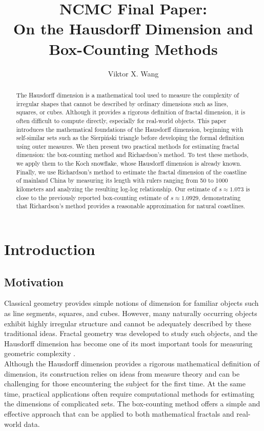 \documentclass{article}
\title{NCMC Final Paper: \\ On the Hausdorff Dimension and Box-Counting Methods}
\author{Viktor X. Wang}
\begin{document}
\maketitle

\begin{abstract}
The Hausdorff dimension is a mathematical tool used to measure the complexity of irregular shapes that cannot be described by ordinary dimensions such as lines, squares, or cubes. Although it provides a rigorous definition of fractal dimension, it is often difficult to compute directly, especially for real-world objects. This paper introduces the mathematical foundations of the Hausdorff dimension, beginning with self-similar sets such as the Sierpiński triangle before developing the formal definition using outer measures. We then present two practical methods for estimating fractal dimension: the box-counting method and Richardson's method. To test these methods, we apply them to the Koch snowflake, whose Hausdorff dimension is already known. Finally, we use Richardson's method to estimate the fractal dimension of the coastline of mainland China by measuring its length with rulers ranging from 50 to 1000 kilometers and analyzing the resulting log-log relationship. Our estimate of $s \approx 1.073$ is close to the previously reported box-counting estimate of $s \approx 1.0929$, demonstrating that Richardson's method provides a reasonable approximation for natural coastlines.
\end{abstract}

\section{Introduction}
\subsection{Motivation}


Classical geometry provides simple notions of dimension for familiar objects
such as line segments, squares, and cubes. However, many naturally occurring
objects exhibit highly irregular structure and cannot be adequately described by
these traditional ideas. Fractal geometry was developed to study such objects,
and the Hausdorff dimension has become one of its most important tools for
measuring geometric complexity \cite{falconer2014fractal, michelucci2025hausdorff}.\\

Although the Hausdorff dimension provides a rigorous mathematical definition of
dimension, its construction relies on ideas from measure theory and can be
challenging for those encountering the subject for the first time. At the same
time, practical applications often require computational methods for estimating
the dimensions of complicated sets. The box-counting method offers a simple and
effective approach that can be applied to both mathematical fractals and
real-world data.\\
\end{document}
